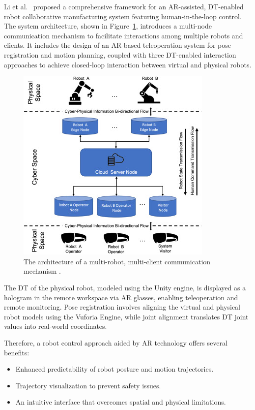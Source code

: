 Li et al.~\cite{this-article} proposed a comprehensive framework for an \ac{AR}-assisted, \ac{DT}-enabled robot collaborative manufacturing system featuring human-in-the-loop control. The system architecture, shown in Figure~\ref{f:system-framework}, introduces a multi-node communication mechanism to facilitate interactions among multiple robots and clients. It includes the design of an \ac{AR}-based teleoperation system for pose registration and motion planning, coupled with three \ac{DT}-enabled interaction approaches to achieve closed-loop interaction between virtual and physical robots.

\begin{figure}[!htpb]
    \centering
    \includegraphics[width=0.5\linewidth]{figs/framework.jpg}
    \caption{The architecture of a multi-robot, multi-client communication mechanism \cite{LI2022102321}.}
    \label{f:system-framework}
\end{figure}

The \ac{DT} of the physical robot, modeled using the Unity engine, is displayed as a hologram in the remote workspace via \ac{AR} glasses, enabling teleoperation and remote monitoring. Pose registration involves aligning the virtual and physical robot models using the Vuforia Engine, while joint alignment translates \ac{DT} joint values into real-world coordinates.

Therefore, a robot control approach aided by \ac{AR} technology offers several benefits:
\begin{itemize}
    \item Enhanced predictability of robot posture and motion trajectories.
    \item Trajectory visualization to prevent safety issues.
    \item An intuitive interface that overcomes spatial and physical limitations.
\end{itemize}

